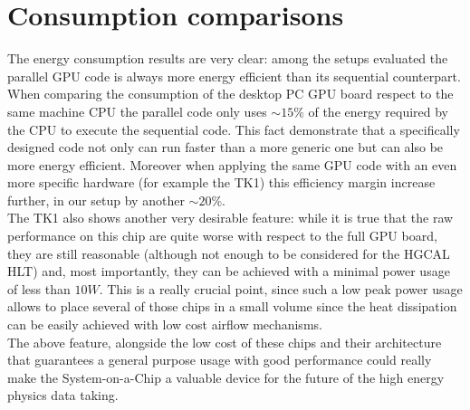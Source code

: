 \section{Consumption comparisons}
The energy consumption results are very clear: among the setups evaluated the parallel GPU code is always more energy efficient than its sequential counterpart. When comparing the consumption of the desktop PC GPU board respect to the same machine CPU the parallel code only uses $\sim15\%$ of the energy required by the CPU to execute the sequential code. This fact demonstrate that a specifically designed code not only can run faster than a more generic one but can also be more energy efficient. Moreover when applying the same GPU code with an even more specific hardware (for example the TK1) this efficiency margin increase further, in our setup by another $\sim20\%$.\\
The TK1 also shows another very desirable feature: while it is true that the raw performance on this chip are quite worse with respect to the full GPU board, they are still reasonable (although not enough to be considered for the HGCAL HLT) and, most importantly, they can be achieved with a minimal power usage of less than $10 \unit{W}$. This is a really crucial point, since such a low peak power usage allows to place several of those chips in a small volume since the heat dissipation can be easily achieved with low cost airflow mechanisms.\\
The above feature, alongside the low cost of these chips and their architecture that guarantees a general purpose usage with good performance could really make the System-on-a-Chip a valuable device for the future of the high energy physics data taking.
